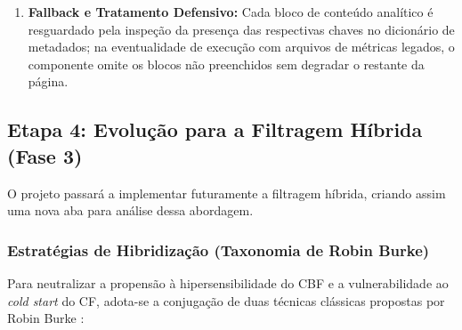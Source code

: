 \begin{enumerate}[label=\textbf{\arabic*.}]
\begin{itemize}
        \item \textbf{Limitações Abertas:} Registro público de fragilidades do catálogo primário, incluindo a esparsidade do campo \texttt{skills\_desc} ($\approx 98\%$ de ausências), a degradação e falha do algoritmo KNN em matrizes ultrarralas e a dependência do motor híbrido para mitigação do \textit{cold start} na Fase 3.
    \end{itemize}
    \item \textbf{Fallback e Tratamento Defensivo:} Cada bloco de conteúdo analítico é resguardado pela inspeção da presença das respectivas chaves no dicionário de metadados; na eventualidade de execução com arquivos de métricas legados, o componente omite os blocos não preenchidos sem degradar o restante da página.
\end{enumerate}

\subsection{Etapa 4: Evolução para a Filtragem Híbrida (Fase 3)}

O projeto passará a implementar futuramente a filtragem híbrida, criando assim uma nova aba para análise dessa abordagem.

\subsubsection{Estratégias de Hibridização (Taxonomia de Robin Burke)}

Para neutralizar a propensão à hipersensibilidade do CBF e a vulnerabilidade ao \textit{cold start} do CF, adota-se a conjugação de duas técnicas clássicas propostas por Robin Burke \cite{burke2002}:

